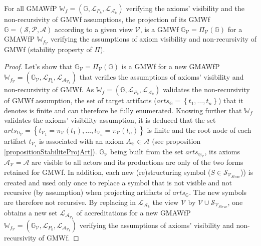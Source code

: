 \begin{proposition}
	\label{propositionStabiliteProjGMWf}
	For all GMAWfP $\mathbb{W}_f=\left(\mathbb{G}, \mathcal{L}_{P_k}, \mathcal{L}_{\mathcal{A}_k} \right)$ verifying the axioms' visibility and the non-recursivity of GMWf assumptions, the projection of its GMWf $\mathbb{G}=\left(\mathcal{S},\mathcal{P},\mathcal{A}\right)$ according to a given view $\mathcal{V}$, is a GMWf $\mathbb{G}_{\mathcal{V}} = \Pi_{\mathcal{V}}\left(\mathbb{G} \right)$ for a GMAWfP $\mathbb{W}_{f_{\mathcal{V}}}$ verifying the assumptions of axiom visibility and non-recursivity of GMWf (stability property of $\Pi$).
\end{proposition}

\begin{proof}
	Let's show that $\mathbb{G}_{\mathcal{V}} = \Pi_{\mathcal{V}}\left(\mathbb{G} \right)$ is a GMWf for a new GMAWfP $\mathbb{W}_{f_{\mathcal{V}}}=\left(\mathbb{G}_{\mathcal{V}}, \mathcal{L}_{P_k}, \mathcal{L}_{\mathcal{A}_{\mathcal{V}_k}} \right)$ that verifies the assumptions of axioms' visibility and non-recursivity of GMWf. 
	As $\mathbb{W}_f=\left(\mathbb{G}, \mathcal{L}_{P_k}, \mathcal{L}_{\mathcal{A}_k} \right)$ validates the non-recursivity of GMWf assumption, the set of target artifacts ($arts_{\mathbb{G}}=\left\{t_1,\ldots,t_n\right\}$) that it denotes is finite and can therefore be fully enumerated. Knowing further that $\mathbb{W}_f$ validates the axioms' visibility assumption, it is deduced that the set $arts_{\mathbb{G}_{\mathcal{V}}} = \left\{t_{\mathcal{V}_1}=\pi_{\mathcal{V}}\left(t_1\right), \ldots,t_{\mathcal{V}_n}=\pi_{\mathcal{V}}\left(t_n\right)\right\}$ is finite and the root node of each artifact $t_{\mathcal{V}_i}$ is associated with an axiom $A_{\mathbb{G}} \in \mathcal{A}$ (see proposition \ref{propositionStabiliteProjArt}). $\mathbb{G}_{\mathcal{V}}$ being built from the set $arts_{\mathbb{G}_{\mathcal{V}}}$, its axioms $\mathcal{A}_{\mathcal{V}}=\mathcal{A}$ are visible to all actors and its productions are only of the two forms retained for GMWf. In addition, each new (re)structuring symbol ($S \in \mathcal{S}_{\mathcal{V}_{Struc}}$)) is created and used only once to replace a symbol that is not visible and not recursive (by assumption) when projecting artifacts of $arts_{\mathbb{G}}$. The new symbols are therefore not recursive. By replacing in $\mathcal{L}_{\mathcal{A}_k}$ the view $\mathcal{V}$ by $\mathcal{V} \cup \mathcal{S}_{\mathcal{V}_{Struc}}$, one obtains a new set $\mathcal{L}_{\mathcal{A}_{\mathcal{V}_k}}$ of accreditations for a new GMAWfP $\mathbb{W}_{f_{\mathcal{V}}}=\left(\mathbb{G}_{\mathcal{V}}, \mathcal{L}_{P_k}, \mathcal{L}_{\mathcal{A}_{\mathcal{V}_k}} \right)$ verifying the assumptions of axioms' visibility and non-recursivity of GMWf.
\end{proof}


